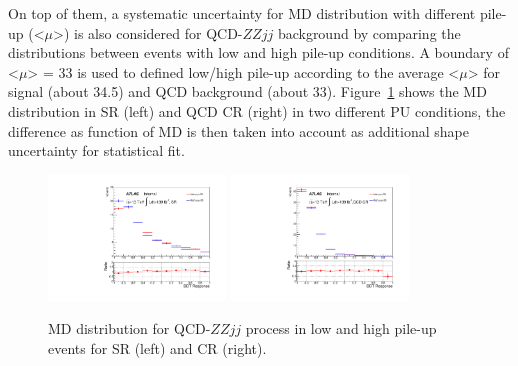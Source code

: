 On top of them, a systematic uncertainty for MD distribution with different pile-up (<$\mu$>) is also considered for QCD-$ZZjj$ background
by comparing the distributions between events with low and high pile-up conditions.
A boundary of <$\mu$> = 33 is used to defined low/high pile-up according to the average <$\mu$> for signal (about 34.5) and QCD background (about 33).
Figure~\ref{fig:syst_exp_pu} shows the MD distribution in SR (left) and QCD CR (right) in two different PU conditions, 
the difference as function of MD is then taken into account as additional shape uncertainty for statistical fit.
\begin{figure}[H]
  \centering
  \includegraphics[width=0.42\textwidth]{figures/VBSZZ/syst/pu_uncer_BDT_SR.pdf}
  \includegraphics[width=0.42\textwidth]{figures/VBSZZ/syst/pu_uncer_BDT_CR.pdf}
  \caption{MD distribution for QCD-$ZZjj$ process in low and high pile-up events for SR (left) and CR (right).}
  \label{fig:syst_exp_pu}
\end{figure}

